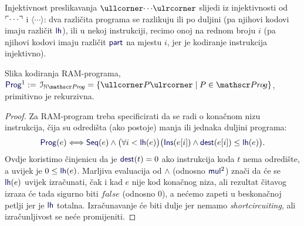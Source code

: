 Injektivnost preslikavanja $\kprog{\cdots}$ slijedi iz injektivnosti od $\ulcorner\cdots\urcorner$ i $\langle\cdots\rangle$: dva različita programa se razlikuju ili po duljini (pa njihovi kodovi imaju različit $\f{lh}$), ili u nekoj instrukciji, recimo onoj na rednom broju $i$ (pa njihovi kodovi imaju različit $\f{part}$ na mjestu $i$, jer je kodiranje instrukcija injektivno).

\begin{lema}[{name=[primitivna rekurzivnost slike kodiranja RAM-programa]}]
	Slika kodiranja RAM-programa, $\f{Prog}^1:=\,\im{\N\mathscr P\mspace{-1mu}r\mspace{-2mu}o\mspace{-2mu}g}=\{\kprog P\mid P\in\mathscr Pr\mspace{-1mu}o\mspace{-2mu}g\}$,\\ primitivno je rekurzivna.
\end{lema}
\begin{proof}
Za RAM-program treba specificirati da se radi o konačnom nizu instrukcija, čija su odredišta (ako postoje) manja ili jednaka duljini programa:
\begin{equation}\label{eq:Progget}
    \f{Prog}(e)\Longleftrightarrow\f{Seq}(e)\wedge\bigl(\forall i<\f{lh}(e)\bigr)\bigl(\f{Ins}(e[i])\land\f{dest}(e[i])\le \f{lh}(e)\bigr)\text.\\
\end{equation}
Ovdje koristimo činjenicu da je $\f{dest}(t)\eq0$ ako instrukcija koda $t$ nema od\-re\-di\-šte, a uvijek je $0\le\f{lh}(e)$. Marljiva evaluacija od $\land$ (odnosno $\f{mul}^2$) znači da će se $\f{lh}(e)$ uvijek izračunati, čak i kad $e$ nije kod konačnog niza, ali rezultat čitavog izraza će tada sigurno biti $\mathit{false}$ (odnosno $0$), a nećemo zapeti u beskonačnoj petlji jer je $\f{lh}$ totalna. Izračunavanje će biti dulje jer nemamo \emph{shortcircuiting}, ali izračunljivost se neće promijeniti.
\end{proof}





